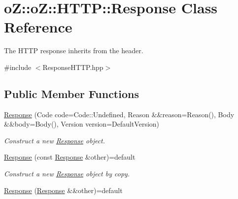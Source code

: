 \hypertarget{classo_z_1_1o_z_1_1_h_t_t_p_1_1_response}{}\section{oZ\+::oZ\+::H\+T\+TP\+::Response Class Reference}
\label{classo_z_1_1o_z_1_1_h_t_t_p_1_1_response}


The H\+T\+TP response inherits from the header.  




{\ttfamily \#include $<$Response\+H\+T\+T\+P.\+hpp$>$}

\subsection*{Public Member Functions}
\begin{DoxyCompactItemize}
\item 
\mbox{\label{classo_z_1_1o_z_1_1_h_t_t_p_1_1_response_aa5b5d0b822053603c5fde6e301e1ca67}} 
\mbox{\hyperlink{classo_z_1_1o_z_1_1_h_t_t_p_1_1_response_aa5b5d0b822053603c5fde6e301e1ca67}{Response}} (Code code=Code\+::\+Undefined, Reason \&\&reason=Reason(), Body \&\&body=Body(), Version version=Default\+Version)
\begin{DoxyCompactList}\small\item\em Construct a new \mbox{\hyperlink{classo_z_1_1o_z_1_1_h_t_t_p_1_1_response}{Response}} object. \end{DoxyCompactList}\item 
\mbox{\label{classo_z_1_1o_z_1_1_h_t_t_p_1_1_response_a0a0c84d1d4e5aa1574e18d84f5daba4e}} 
\mbox{\hyperlink{classo_z_1_1o_z_1_1_h_t_t_p_1_1_response_a0a0c84d1d4e5aa1574e18d84f5daba4e}{Response}} (const \mbox{\hyperlink{classo_z_1_1o_z_1_1_h_t_t_p_1_1_response}{Response}} \&other)=default
\begin{DoxyCompactList}\small\item\em Construct a new \mbox{\hyperlink{classo_z_1_1o_z_1_1_h_t_t_p_1_1_response}{Response}} object by copy. \end{DoxyCompactList}\item 
\mbox{\label{classo_z_1_1o_z_1_1_h_t_t_p_1_1_response_afc44351c01bb3eca89add0bd80ae4995}} 
\mbox{\hyperlink{classo_z_1_1o_z_1_1_h_t_t_p_1_1_response_afc44351c01bb3eca89add0bd80ae4995}{Response}} (\mbox{\hyperlink{classo_z_1_1o_z_1_1_h_t_t_p_1_1_response}{Response}} \&\&other)=default

\end{DoxyCompactItemize}

